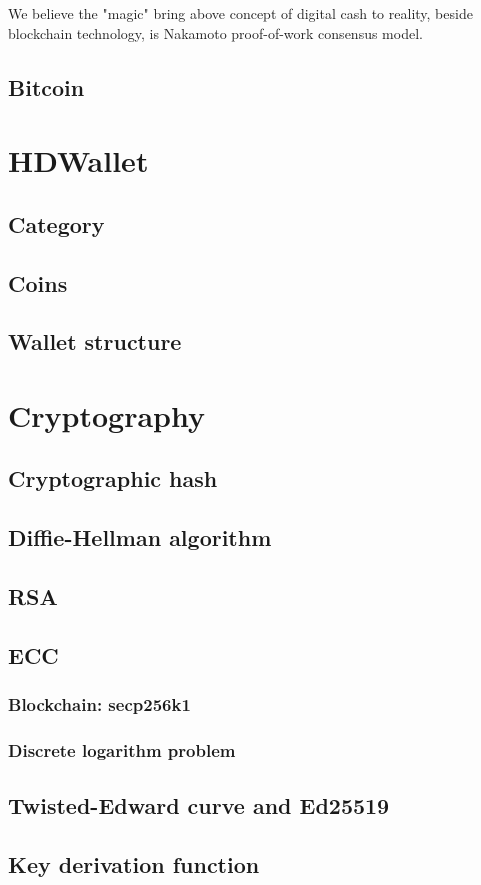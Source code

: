 We believe the "magic" bring above concept of digital cash to reality, beside blockchain technology, is Nakamoto proof-of-work consensus model.

\subsection{Bitcoin}

\section{HDWallet}

\subsection{Category}

\subsection{Coins}

\subsection{Wallet structure}

\section{Cryptography}

\subsection{Cryptographic hash}

\subsection{Diffie-Hellman algorithm}

\subsection{RSA}

\subsection{ECC}

\subsubsection{Blockchain: secp256k1}

\subsubsection{Discrete logarithm problem}

\subsection{Twisted-Edward curve and Ed25519}

\subsection{Key derivation function}
